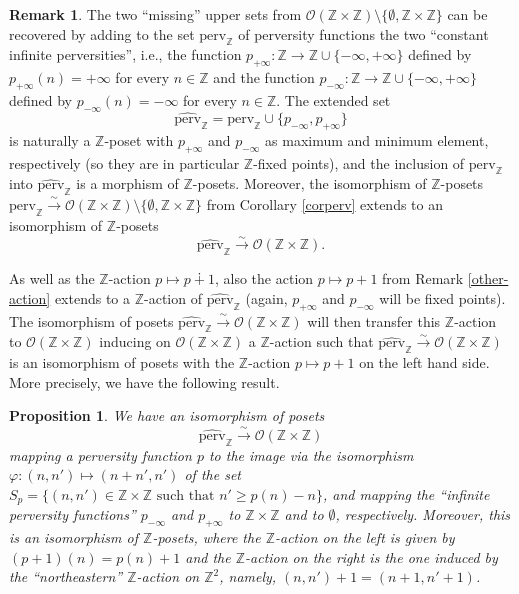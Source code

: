 \documentclass{article}
\newtheorem{prop}[thm]{Proposition}
\theoremstyle{definition}
\newtheorem{rem}[thm]{Remark}
\newcommand{\Z}{\mathbb{Z}}
\newcommand{\Oo}{\mathcal{O}}
\begin{document}
\begin{rem}\label{missing}
The two ``missing'' upper sets from $\Oo(\Z\times \Z)\setminus\{\emptyset,\Z\times\Z\}$ can be recovered by adding to the set $\mathrm{perv}_\Z$ of perversity functions the two ``constant infinite perversities'', i.e., the function $p_{+\infty}\colon \Z\to \Z\cup\{-\infty,+\infty\}$ defined by $p_{+\infty}(n)=+\infty$ for every $n\in\Z$ and the function  $p_{-\infty}\colon \Z\to \Z\cup\{-\infty,+\infty\}$ defined by $p_{-\infty}(n)=-\infty$ for every $n\in\Z$. The extended set
\[
\widehat{\mathrm{perv}}_\Z =\mathrm{perv}_\Z\cup\{p_{-\infty},p_{+\infty}\}
\]
is naturally a $\Z$-poset with $p_{+\infty}$ and $p_{-\infty}$ as maximum and minimum element, respectively (so they are in particular $\Z$-fixed points), and the inclusion of $\mathrm{perv}_\Z$ into $\widehat{\mathrm{perv}}_\Z$ is a morphism of $\Z$-posets. Moreover, the isomorphism of $\Z$-posets $\mathrm{perv}_\Z\xrightarrow{\sim} \Oo(\Z\times \Z)\setminus\{\emptyset,\Z\times\Z\}$ from Corollary \ref{corperv} extends to an isomorphism of $\Z$-posets
\[
\widehat{\mathrm{perv}}_\Z\xrightarrow{\sim} \Oo(\Z\times \Z).
\]
\end{rem}
As well as the $\Z$-action $p\mapsto p\dotplus 1$, also the action $p\mapsto p+1$ from Remark \ref{other-action} extends to a $\Z$-action of $\widehat{\mathrm{perv}}_\Z$ (again, $p_{+\infty}$ and $p_{-\infty}$ will be fixed points). The isomorphism of posets $\widehat{\mathrm{perv}}_\Z\xrightarrow{\sim} \Oo(\Z\times \Z)$ will then transfer this $\Z$-action to $\Oo(\Z\times \Z)$ inducing on $\Oo(\Z\times \Z)$ a $\Z$-action such that $\widehat{\mathrm{perv}}_\Z\xrightarrow{\sim} \Oo(\Z\times \Z)$ is an isomorphism of posets with the $\Z$-action $p\mapsto p+1$ on the left hand side. More precisely, we have the following result.
\begin{prop}
\label{prop-perv}
We have an isomorphism of posets
\[
\widehat{\mathrm{perv}}_\Z\xrightarrow{\sim} \Oo(\Z\times \Z)
\]
mapping a perversity function $p$ to the image via the isomorphism $\varphi\colon (n,n')\mapsto (n+n',n')$ of the set $S_p=\{(n,n')\in \Z\times \Z\text{ such that } n'\geq p(n)-n\}$, and mapping the ``infinite perversity functions'' $p_{-\infty}$ and $p_{+\infty}$ to $\Z\times \Z$ and to $\emptyset$, respectively. Moreover, this is an isomorphism of $\Z$-posets, where the $\Z$-action on the left is given by $(p+1)(n)=p(n)+1$ and the $\Z$-action on the right is the one induced by the ``northeastern'' $\Z$-action on $\Z^2$, namely, $(n,n')+1=(n+1,n'+1)$. 
\end{prop}
\end{document}
